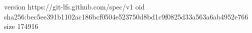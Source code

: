 version https://git-lfs.github.com/spec/v1
oid sha256:bec5ee391b1102ac186bcf0504e523750d8bd1c9f0825d33a563a6ab4952e766
size 174916

